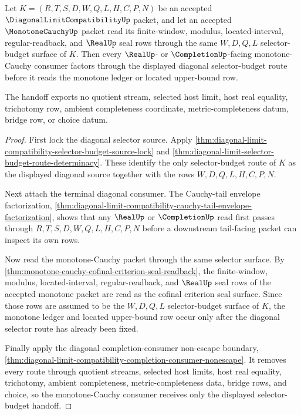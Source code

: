 \begin{theorem}
\label{thm:diagonal-limit-selector-budget-monotone-cauchy-handoff}
Let $K=(R,T,S,D,W,Q,L,H,C,P,N)$ be an accepted $\DiagonalLimitCompatibilityUp$ packet, and let an accepted $\MonotoneCauchyUp$ packet read its finite-window, modulus, located-interval, regular-readback, and $\RealUp$ seal rows through the same $W,D,Q,L$ selector-budget surface of $K$. Then every $\RealUp$- or $\CompletionUp$-facing monotone-Cauchy consumer factors through the displayed diagonal selector-budget route before it reads the monotone ledger or located upper-bound row.

The handoff exports no quotient stream, selected host limit, host real equality, trichotomy row, ambient completeness coordinate, metric-completeness datum, bridge row, or choice datum.
\end{theorem}
\begin{proof}
First lock the diagonal selector source. Apply \autoref{thm:diagonal-limit-compatibility-selector-budget-source-lock} and \autoref{thm:diagonal-limit-selector-budget-route-determinacy}. These identify the only selector-budget route of $K$ as the displayed diagonal source together with the rows $W,D,Q,L,H,C,P,N$.

Next attach the terminal diagonal consumer. The Cauchy-tail envelope factorization, \autoref{thm:diagonal-limit-compatibility-cauchy-tail-envelope-factorization}, shows that any $\RealUp$ or $\CompletionUp$ read first passes through $R,T,S,D,W,Q,L,H,C,P,N$ before a downstream tail-facing packet can inspect its own rows.

Now read the monotone-Cauchy packet through the same selector surface. By \autoref{thm:monotone-cauchy-cofinal-criterion-seal-readback}, the finite-window, modulus, located-interval, regular-readback, and $\RealUp$ seal rows of the accepted monotone packet are read as the cofinal criterion seal surface. Since those rows are assumed to be the $W,D,Q,L$ selector-budget surface of $K$, the monotone ledger and located upper-bound row occur only after the diagonal selector route has already been fixed.

Finally apply the diagonal completion-consumer non-escape boundary, \autoref{thm:diagonal-limit-compatibility-completion-consumer-nonescape}. It removes every route through quotient streams, selected host limits, host real equality, trichotomy, ambient completeness, metric-completeness data, bridge rows, and choice, so the monotone-Cauchy consumer receives only the displayed selector-budget handoff.
\end{proof}

